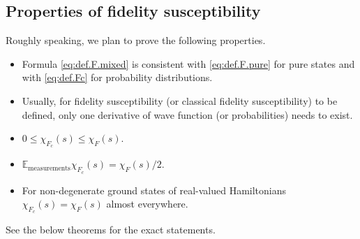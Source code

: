 \documentclass[
  american,aps,pra,reprint,floatfix,nofootinbib,superscriptaddress
]{revtex4-2}
\begin{document}
\subsection{Properties of fidelity susceptibility}
Roughly speaking, we plan to prove the following properties.
\begin{itemize}
  \item Formula \eqref{eq:def.F.mixed} is consistent with \eqref{eq:def.F.pure}
    for pure states and with \eqref{eq:def.Fc} for probability distributions.
  \item Usually, for fidelity susceptibility (or classical fidelity
    susceptibility) to be defined, only one derivative of wave function
    (or probabilities) needs to exist.
  \item $0 \leq \chi_{F_c}(s) \leq \chi_F(s)$.
  \item $\mathbb{E}_{\textrm{measurements}} \chi_{F_c}(s) = \chi_F(s)/2$.
  \item For non-degenerate ground states of real-valued Hamiltonians
  $\chi_{F_c}(s) = \chi_F(s)$ almost everywhere.
\end{itemize}
See the below theorems for the exact statements.
\end{document}

